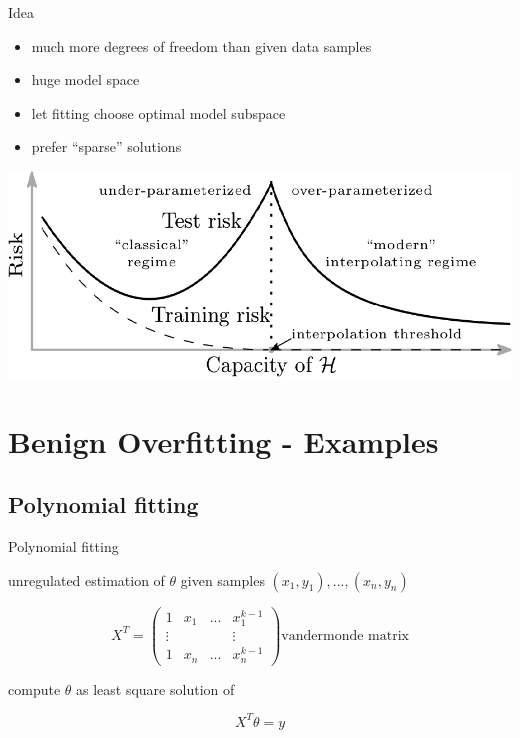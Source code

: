\documentclass{beamer}
\begin{document}
\begin{frame}{Idea}
\begin{itemize}
	\item much more degrees of freedom than given data samples
	\item huge model space
	\item let fitting choose optimal model subspace
	\item prefer \enquote{sparse} solutions
\end{itemize}
\vspace{0.1cm}
\pause
\includegraphics[width=\textwidth]{source/BenignOverfittingModel.png}
\end{frame}

\section{Benign Overfitting - Examples}
\subsection{Polynomial fitting}
\begin{frame}{Polynomial fitting}
\begin{block}{unregulated  estimation of \(\theta\)}
given samples \((x_1, y_1), ..., (x_n, y_n)\)

		\begin{equation*}
			X^T = \begin{pmatrix}
			1 & x_1 & ... & x_1^{k-1}\\
			\vdots &&& \vdots\\
			1 & x_n & ... & x_n^{k-1}
			\end{pmatrix} \text{vandermonde matrix}
		\end{equation*}
		
compute \(\theta\) as least square solution of

\begin{equation}
X^T \theta = y
\end{equation}
\end{block}
\end{frame}
\end{document}
